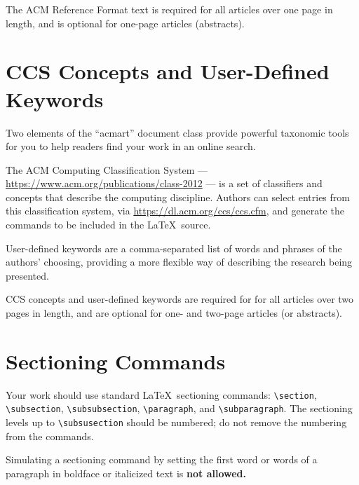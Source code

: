 \documentclass[sigconf, review]{acmart}
\begin{document}
The ACM Reference Format text is required for all articles over one
page in length, and is optional for one-page articles (abstracts).

\section{CCS Concepts and User-Defined Keywords}

Two elements of the ``acmart'' document class provide powerful
taxonomic tools for you to help readers find your work in an online
search.

The ACM Computing Classification System ---
\url{https://www.acm.org/publications/class-2012} --- is a set of
classifiers and concepts that describe the computing
discipline. Authors can select entries from this classification
system, via \url{https://dl.acm.org/ccs/ccs.cfm}, and generate the
commands to be included in the \LaTeX\ source.

User-defined keywords are a comma-separated list of words and phrases
of the authors' choosing, providing a more flexible way of describing
the research being presented.

CCS concepts and user-defined keywords are required for for all
articles over two pages in length, and are optional for one- and
two-page articles (or abstracts).

\section{Sectioning Commands}

Your work should use standard \LaTeX\ sectioning commands:
\verb|\section|, \verb|\subsection|, \verb|\subsubsection|,
\verb|\paragraph|, and \verb|\subparagraph|. The sectioning levels up to
\verb|\subsusection| should be numbered; do not remove the numbering
from the commands.

Simulating a sectioning command by setting the first word or words of
a paragraph in boldface or italicized text is {\bfseries not allowed.}
\end{document}

